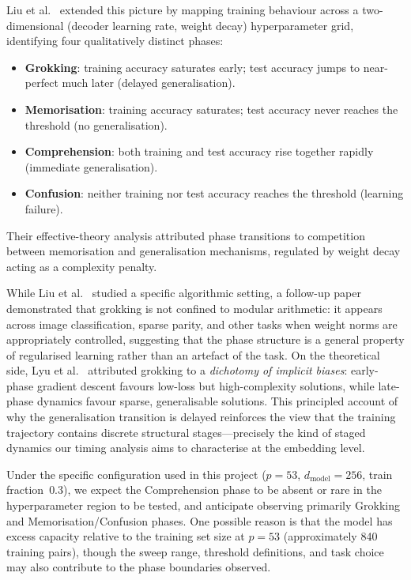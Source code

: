 \documentclass[12pt,openany,a4paper]{book}
\begin{document}
Liu et al.\ \cite{liu2022towards} extended this picture by mapping
training behaviour across a two-dimensional (decoder learning rate,
weight decay) hyperparameter grid, identifying four qualitatively
distinct phases:
\begin{itemize}
  \item \textbf{Grokking}: training accuracy saturates early; test
    accuracy jumps to near-perfect much later (delayed generalisation).
  \item \textbf{Memorisation}: training accuracy saturates; test
    accuracy never reaches the threshold (no generalisation).
  \item \textbf{Comprehension}: both training and test accuracy rise
    together rapidly (immediate generalisation).
  \item \textbf{Confusion}: neither training nor test accuracy reaches
    the threshold (learning failure).
\end{itemize}
Their effective-theory analysis attributed phase transitions to
competition between memorisation and generalisation mechanisms,
regulated by weight decay acting as a complexity penalty.

While Liu et al.\ \cite{liu2022towards} studied a specific algorithmic setting,
a follow-up paper \cite{liu2023omnigrok} demonstrated that grokking is not
confined to modular arithmetic: it appears across image classification,
sparse parity, and other tasks when weight norms are appropriately
controlled, suggesting that the phase structure is a general property
of regularised learning rather than an artefact of the task.
On the theoretical side, Lyu et al.\ \cite{lyu2024dichotomy} attributed
grokking to a \emph{dichotomy of implicit biases}: early-phase gradient
descent favours low-loss but high-complexity solutions, while late-phase
dynamics favour sparse, generalisable solutions.
This principled account of why the generalisation transition is delayed
reinforces the view that the training trajectory contains discrete
structural stages---precisely the kind of staged dynamics our timing
analysis aims to characterise at the embedding level.

Under the specific configuration used in this project ($p=53$,
$d_{\mathrm{model}}=256$, train fraction~$0.3$), we expect
the Comprehension phase to be absent or rare in the hyperparameter
region to be tested, and anticipate observing primarily Grokking
and Memorisation/Confusion phases.
One possible reason is that the model has excess capacity relative
to the training set size at $p=53$ (approximately 840 training
pairs), though the sweep range, threshold definitions, and task
choice may also contribute to the phase boundaries observed.
\end{document}
